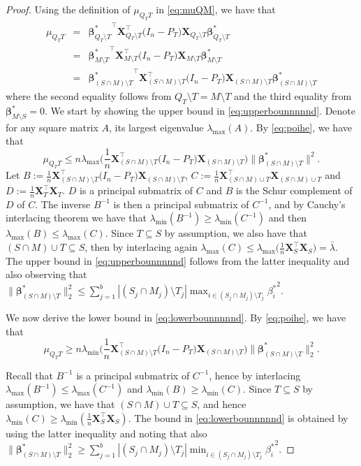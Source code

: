 \documentclass[
  12pt]{article}
\newcommand{\bbeta}{\boldsymbol{\beta}}
\newcommand{\bX}{\mathbf{X}}
\begin{document}
\begin{proof}
Using the definition of $\mu_{Q_T T}$ in \eqref{eq:muQM}, we have that 
\begin{eqnarray}
    \mu_{Q_TT}&=&{\bbeta^*_{Q_T\setminus T}}^{\top}\bX_{Q_T\setminus T}^{\top}  \big(I_n-P_T\big) \bX_{Q_T\setminus T} \bbeta^*_{Q_T\setminus T}\nonumber\\
    &=&{\bbeta^*_{M\setminus T}}^{\top}\bX_{M\setminus T}^{\top}  \big(I_n-P_T\big) \bX_{M\setminus T} \bbeta^*_{M\setminus T}\nonumber\\
    &=&{\bbeta^*_{(S\cap M)\setminus T}}^{\top}\bX_{(S\cap M)\setminus T}^{\top}  \big(I_n-P_T\big) \bX_{(S\cap M)\setminus T} \bbeta^*_{(S\cap M)\setminus T}\label{eq:poihe}
\end{eqnarray}
where the second equality follows from $Q_T\setminus T =M\setminus T $ and the third equality from $\bbeta^*_{M\setminus S}=0$.
We start by showing the upper bound in \eqref{eq:upperbounnnnnd}. Denote for any square matrix $A$, its largest eigenvalue 
$\lambda_{\max}(A)$. By \eqref{eq:poihe}, we have that
$$\mu_{Q_TT}\leq n\lambda_{\max}\Big(\frac{1}{n}\bX_{(S\cap M)\setminus T}^{\top}  \big(I_n-P_T\big) \bX_{(S\cap M)\setminus T}\Big) \|\bbeta^*_{(S\cap M)\setminus T}\|^2.$$
Let $B:=\tfrac{1}{n}\bX_{(S\cap M)\setminus T}^{\top}  \big(I_n-P_T\big) \bX_{(S\cap M)\setminus T}$, $C:=\tfrac{1}{n}\bX_{(S\cap M)\cup T}^{\top}\bX_{(S\cap M)\cup T}$ and $D:=\tfrac{1}{n}\bX_T^{\top} \bX_T$. $D$ is a principal submatrix of $C$ and $B$ is the Schur complement of $D$ of $C$. The inverse $B^{-1}$ is then a principal submatrix of $C^{-1}$, and by Cauchy's interlacing theorem we have that   $\lambda_{\min}(B^{-1})\geq \lambda_{\min}(C^{-1})$ and then $\lambda_{\max}(B)\leq \lambda_{\max}(C)$. Since $T \subseteq S$ by assumption, we also have that $(S\cap M)\cup T \subseteq S$, then by interlacing again $\lambda_{\max}(C)\leq \lambda_{\max}\Big(\tfrac{1}{n}\bX_S^{\top}\bX_S\Big)=\bar{\lambda}$. The upper bound in \eqref{eq:upperbounnnnnd} follows from the latter inequality and also observing that $\|\bbeta^*_{(S\cap M)\setminus T}\|_2^2\leq \sum_{j=1}^b |(S_j\cap M_j)\setminus T_j|\max_{i\in (S_j\cap M_j)\setminus T_j}{\beta_i^*}^2$.

We now derive the lower bound in \eqref{eq:lowerbounnnnnd}. By \eqref{eq:poihe}, we have that %
$$\mu_{Q_TT}\geq n\lambda_{\min}\Big(\frac{1}{n}\bX_{(S\cap M)\setminus T}^{\top}  \big(I_n-P_T\big) \bX_{(S\cap M)\setminus T}\Big) \|\bbeta^*_{(S\cap M)\setminus T}\|_2^2.$$

Recall that $B^{-1}$ is a principal submatrix of $C^{-1}$, hence by interlacing $\lambda_{\max}(B^{-1})\leq \lambda_{\max}(C^{-1})$ and $\lambda_{\min}(B)\geq \lambda_{\min}(C)$. Since $T \subseteq S$ by assumption, we have that $(S\cap M)\cup T \subseteq S$, and hence $\lambda_{\min}(C)\geq\lambda_{\min}(\frac{1}{n}\bX_S^{\top} \bX_S)$.
The bound in \eqref{eq:lowerbounnnnnd} is obtained by using the latter inequality and noting that also $\|\bbeta^*_{(S\cap M)\setminus T}\|_2^2\geq \sum_{j=1}^b |(S_j\cap M_j)\setminus T_j|\min_{i\in (S_j\cap M_j)\setminus T_j}{\beta_i^*}^2.$
\end{proof}
\end{document}
